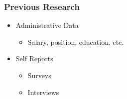 \documentclass[xcolor={table}, fleqn]{beamer}
\newenvironment{changemargin}[2]{%
  \begin{list}{}{%
    \setlength{\topsep}{0pt}%
    \setlength{\leftmargin}{#1}%
    \setlength{\rightmargin}{#2}%
    \setlength{\listparindent}{\parindent}%
    \setlength{\itemindent}{\parindent}%
    \setlength{\parsep}{\parskip}%
  }%
  \item[]}{\end{list}}
\begin{document}
%

\begin{frame}\frametitle{Previous Research}
	\LARGE
\begin{itemize}
	\item Administrative Data
	\vspace*{.2in}
	\begin{itemize}
		\LARGE
		\item Salary, position, education, etc.
	\end{itemize}
	\vspace*{.2in}
	\item Self Reports
	\vspace*{.2in}
	\begin{itemize}
		\LARGE
		\item Surveys
		\vspace*{.2in}
		\item Interviews
	\end{itemize}
\end{itemize}

\end{frame}
\end{document}
